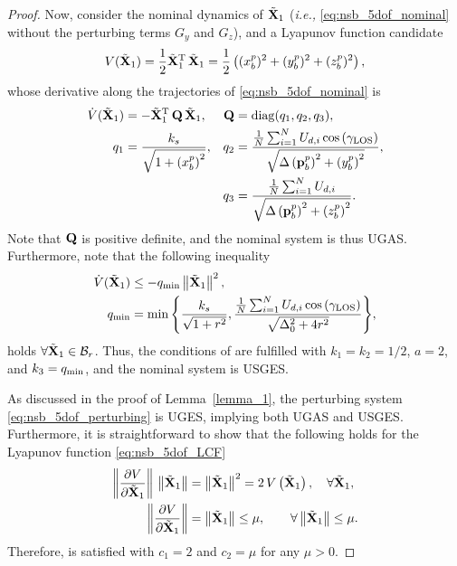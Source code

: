 \begin{proof}
Now, consider the nominal dynamics of $\tilde{\mathbf{X}}_1$ (\emph{i.e.,} \eqref{eq:nsb_5dof_nominal} without the perturbing terms $G_y$ and $G_z$), and a Lyapunov function candidate
\begin{equation}
    V(\tilde{\mathbf{X}}_1) = \frac{1}{2} \tilde{\mathbf{X}}_1^{\mathrm{T}}\,\tilde{\mathbf{X}}_1 = \frac{1}{2} \left((x_b^p)^2 + (y_b^p)^2 + (z_b^p)^2\right), \label{eq:nsb_5dof_LCF}
\end{equation}
whose derivative along the trajectories of \eqref{eq:nsb_5dof_nominal} is
\begin{subequations}
    \begin{align}
        \dot{V}(\tilde{\mathbf{X}}_1) &= - \tilde{\mathbf{X}}_1^{\mathrm{T}}\,\mathbf{Q}\,\tilde{\mathbf{X}}_1, &
        \mathbf{Q} &= {\rm diag}(q_1, q_2, q_3), \\
        q_1 &= {\frac{k_{s}}{\sqrt{1+\left(x_b^p\right)^2}}}, &
        q_2 &= {{\frac{\frac{1}{N}\sum_{i=1}^N U_{d,i}\cos\left(\gamma_{\rm LOS}\right)}{\sqrt{\Delta\left(\mathbf{p}_b^p\right)^2 + \left(y_b^p\right)^2}}}}, \\
        &&q_3 &= {\frac{\frac{1}{N} \sum_{i=1}^N U_{d,i}}{\sqrt{\Delta\left(\mathbf{p}_b^p\right)^2 + \left(z_b^p\right)^2}}}. 
    \end{align}
\end{subequations}
Note that $\mathbf{Q}$ is positive definite, and the nominal system is thus UGAS.
Furthermore, note that the following inequality
\begin{subequations}
    \begin{align}
        \dot{V}(\tilde{\mathbf{X}}_1) &\leq - q_{\rm min} \left\|\tilde{\mathbf{X}}_1\right\|^2, \\
        q_{\rm min} &= {\min \left\{ \frac{k_{s}}{\sqrt{1+r^2}}, \frac{\frac{1}{N} \sum_{i=1}^N U_{d,i}\cos\left(\gamma_{\rm LOS}\right)}{\sqrt{\Delta_0^2 + 4r^2}} \right\}},
    \end{align}
\end{subequations}
holds $\forall \tilde{\mathbf{X}}_1 \in \mathcal{B}_r$.
Thus, the conditions of \cite[Theorem 5]{pettersen_lyapunov_2017} are fulfilled with $k_1 = k_2 = 1/2$, $a = 2$, and $k_3 = q_{\rm min}$, and the nominal system is USGES.

As discussed in the proof of Lemma~\ref{lemma_1}, the perturbing system \eqref{eq:nsb_5dof_perturbing} is UGES, implying both UGAS and USGES.
Furthermore, it is straightforward to show that the following holds for the Lyapunov function \eqref{eq:nsb_5dof_LCF}
\begin{align}
    \left\| \frac{\partial V}{\partial \tilde{\mathbf{X}}_1} \right\| \, \left\|\tilde{\mathbf{X}}_1\right\| &= \left\|\tilde{\mathbf{X}}_1\right\|^2 = 2\,V\left(\tilde{\mathbf{X}}_1\right), \quad \forall \tilde{\mathbf{X}}_1, \\
    \left\| \frac{\partial V}{\partial \tilde{\mathbf{X}}_1} \right\| &= \left\|\tilde{\mathbf{X}}_1\right\| \leq \mu, \quad \quad \forall \left\|\tilde{\mathbf{X}}_1\right\| \leq \mu.
\end{align}
Therefore, \cite[Assumption 1]{pettersen_lyapunov_2017} is satisfied with $c_1 = 2$ and $c_2 = \mu$ for any $\mu > 0$.


\end{proof}
